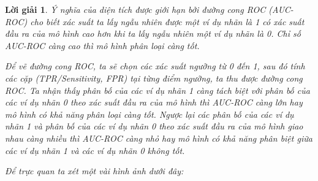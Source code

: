 \documentclass[14pt, a4paper]{article}
\theoremstyle{sltheorem}
\theoremstyle{soltheorem}
\newtheorem*{loigiai}{Lời giải}
\begin{document}
\begin{loigiai}
        Ý nghĩa của diện tích được giới hạn bởi đường cong ROC (AUC-ROC) cho biết xác suất ta lấy ngẫu nhiên được một ví dụ nhãn là 1 có xác suất đầu ra của mô hình cao hơn khi ta lấy ngẫu nhiên một ví dụ nhãn là 0.
        Chỉ số AUC-ROC càng cao thì mô hình phân loại càng tốt.

        Để vẽ đường cong ROC, ta sẽ chọn các xác suất ngưỡng từ 0 đến 1, sau đó tính các cặp (TPR/Sensitivity, FPR) tại từng điểm ngưỡng, ta thu được đường cong ROC.
        Ta nhận thấy phân bố của các ví dụ nhãn 1 càng tách biệt với phân bố của các ví dụ nhãn 0 theo xác suất đầu ra của mô hình thì AUC-ROC càng lớn hay mô hình có khả năng phân loại càng tốt.
        Ngược lại các phân bố của các ví dụ nhãn 1 và phân bố của các ví dụ nhãn 0 theo xác suất đầu ra của mô hình giao nhau càng nhiều thì AUC-ROC càng nhỏ hay mô hình có khả năng phân biệt giữa các ví dụ nhãn 1 và các ví dụ nhãn 0 không tốt. 

        Để trực quan ta xét một vài hình ảnh dưới đây:


\end{loigiai}
\end{document}
